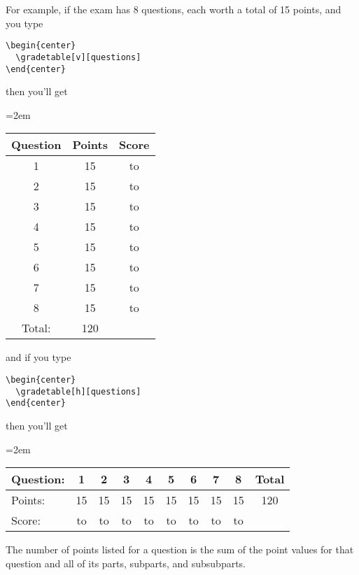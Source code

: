 \documentclass[12pt]{exam}
\begin{document}
For example, if the exam has 8 questions, each worth a total of 15
points, and you type
\begin{verbatim}
\begin{center}
  \gradetable[v][questions]
\end{center}
\end{verbatim}
then you'll get
\begin{center}
  \cwidth=2em
  \renewcommand\arraystretch{1.5}
  \begin{tabular}{|c|c|c|}
    \hline
    Question& Points& Score\\
    \hline
    1& 15& \hbox to \cwidth{\hfill}\\
    \hline
    2& 15& \hbox to \cwidth{\hfill}\\
    \hline
    3& 15& \hbox to \cwidth{\hfill}\\
    \hline
    4& 15& \hbox to \cwidth{\hfill}\\
    \hline
    5& 15& \hbox to \cwidth{\hfill}\\
    \hline
    6& 15& \hbox to \cwidth{\hfill}\\
    \hline
    7& 15& \hbox to \cwidth{\hfill}\\
    \hline
    8& 15& \hbox to \cwidth{\hfill}\\
    \hline
    Total:& 120&\\
    \hline
  \end{tabular}
\end{center}
and if you type
\begin{verbatim}
\begin{center}
  \gradetable[h][questions]
\end{center}
\end{verbatim}
then you'll get
\begin{center}
  \cwidth=2em
  \renewcommand\arraystretch{1.5}
  \begin{tabular}{|l|c|c|c|c|c|c|c|c|c|}
    \hline
    Question:& 1& 2& 3& 4& 5& 6& 7& 8& Total\\
    \hline
    Points:&
    15&
    15&
    15&
    15&
    15&
    15&
    15&
    15&
    120\\
    \hline
    Score:&
    \hbox to \cwidth{\hfill}&
    \hbox to \cwidth{\hfill}&
    \hbox to \cwidth{\hfill}&
    \hbox to \cwidth{\hfill}&
    \hbox to \cwidth{\hfill}&
    \hbox to \cwidth{\hfill}&
    \hbox to \cwidth{\hfill}&
    \hbox to \cwidth{\hfill}&
    \\
    \hline
  \end{tabular}
\end{center}
The number of points listed for a question is the sum of the point
values for that question and all of its parts, subparts, and
subsubparts.
\end{document}
